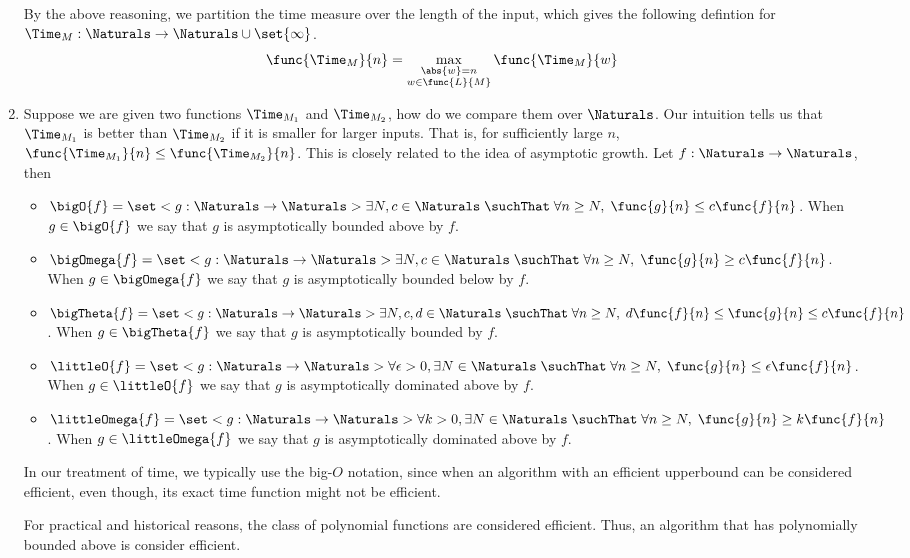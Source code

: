 \begin{enumerate}
    By the above reasoning, we partition the time measure over the length of the input, which gives the following defintion for \(\Time_M : \Naturals \to \Naturals \cup \set{\infty}\).
    \begin{equation*}
        \func{\Time_M}{n} = \max_{\substack{\abs{w} = n \\ w \in \func{L}{M}}} \func{\Time_M}{w}
    \end{equation*}
    \item Suppose we are given two functions \(\Time_{M_1}\) and \(\Time_{M_2}\), how do we compare them over \(\Naturals\). Our intuition tells us that \(\Time_{M_1}\) is better than \(\Time_{M_2}\) if it is smaller for larger inputs. That is, for sufficiently large \(n\), \(\func{\Time_{M_1}}{n} \leq \func{\Time_{M_2}}{n}\). This is closely related to the idea of asymptotic growth. Let \(f : \Naturals \to \Naturals\), then 
    \begin{itemize}
        \item \(\bigO{f} = \set<g : \Naturals \to \Naturals>{ \exists N,c \in \Naturals\; \suchThat \; \forall n \geq N, \; \func{g}{n} \leq c \func{f}{n}}\). When \(g \in \bigO{f}\) we say that \(g\) is asymptotically bounded above by \(f\).
        \item \(\bigOmega{f} = \set<g : \Naturals \to \Naturals>{ \exists N,c \in \Naturals\; \suchThat \; \forall n \geq N, \; \func{g}{n} \geq c \func{f}{n}}\). When \(g \in \bigOmega{f}\) we say that \(g\) is asymptotically bounded below by \(f\).
        \item  \(\bigTheta{f} = \set<g : \Naturals \to \Naturals>{ \exists N,c,d \in \Naturals\; \suchThat \; \forall n \geq N, \; d \func{f}{n} \leq \func{g}{n} \leq c \func{f}{n}}\). When \(g \in \bigTheta{f}\) we say that \(g\) is asymptotically bounded by \(f\).
        \item \(\littleO{f} = \set<g : \Naturals \to \Naturals>{ \forall \epsilon > 0, \exists N \in \Naturals\; \suchThat \; \forall n \geq N, \; \func{g}{n} \leq \epsilon \func{f}{n}}\). When \(g \in \littleO{f}\) we say that \(g\) is asymptotically dominated above by \(f\).
        \item  \(\littleOmega{f} = \set<g : \Naturals \to \Naturals>{ \forall k > 0, \exists N \in \Naturals\; \suchThat \; \forall n \geq N, \;  \func{g}{n} \geq k \func{f}{n}}\). When \(g \in \littleOmega{f}\) we say that \(g\) is asymptotically dominated above by \(f\).
    \end{itemize}
    In our treatment of time, we typically use the big-\(O\) notation, since when an algorithm with an efficient upperbound can be considered efficient, even though, its exact time function might not be efficient. 

    For practical and historical reasons, the class of polynomial functions are considered efficient. Thus, an algorithm that has polynomially bounded above is consider efficient.
\end{enumerate}

